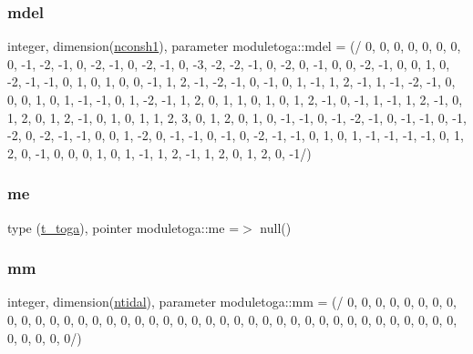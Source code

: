 \subsubsection{\texorpdfstring{mdel}{mdel}}
{\footnotesize\ttfamily integer, dimension(\mbox{\hyperlink{namespacemoduletoga_a06e41646ba24c11ab2e1b513e5c1760c}{nconsh1}}), parameter moduletoga\+::mdel = (/ 0, 0, 0, 0, 0, 0, 0, 0, -\/1, -\/2, -\/1, 0, -\/2, -\/1, 0, -\/2, -\/1, 0, -\/3, -\/2, -\/2, -\/1, 0, -\/2, 0, -\/1, 0, 0, -\/2, -\/1, 0, 0, 1, 0, -\/2, -\/1, -\/1, 0, 1, 0, 1, 0, 0, -\/1, 1, 2, -\/1, -\/2, -\/1, 0, -\/1, 0, 1, -\/1, 1, 2, -\/1, 1, -\/1, -\/2, -\/1, 0, 0, 0, 1, 0, 1, -\/1, -\/1, 0, 1, -\/2, -\/1, 1, 2, 0, 1, 1, 0, 1, 0, 1, 2, -\/1, 0, -\/1, 1, -\/1, 1, 2, -\/1, 0, 1, 2, 0, 1, 2, -\/1, 0, 1, 0, 1, 1, 2, 3, 0, 1, 2, 0, 1, 0, -\/1, -\/1, 0, -\/1, -\/2, -\/1, 0, -\/1, -\/1, 0, -\/1, -\/2, 0, -\/2, -\/1, -\/1, 0, 0, 1, -\/2, 0, -\/1, -\/1, 0, -\/1, 0, -\/2, -\/1, -\/1, 0, 1, 0, 1, -\/1, -\/1, -\/1, -\/1, 0, 1, 2, 0, -\/1, 0, 0, 0, 1, 0, 1, -\/1, 1, 2, -\/1, 1, 2, 0, 1, 2, 0, -\/1/)\hspace{0.3cm}{\ttfamily [private]}}

\mbox{\label{namespacemoduletoga_ae189511573cac5c5cde7e675f45dd4c0}} 
\subsubsection{\texorpdfstring{me}{me}}
{\footnotesize\ttfamily type (\mbox{\hyperlink{structmoduletoga_1_1t__toga}{t\+\_\+toga}}), pointer moduletoga\+::me =$>$ null()\hspace{0.3cm}{\ttfamily [private]}}

\mbox{\label{namespacemoduletoga_a3bf11793a5868095fc707ec57cb7eff0}} 
\subsubsection{\texorpdfstring{mm}{mm}}
{\footnotesize\ttfamily integer, dimension(\mbox{\hyperlink{namespacemoduletoga_ae4b0b997b6803ae8647fdd97f2dda666}{ntidal}}), parameter moduletoga\+::mm = (/ 0, 0, 0, 0, 0, 0, 0, 0, 0, 0, 0, 0, 0, 0, 0, 0, 0, 0, 0, 0, 0, 0, 0, 0, 0, 0, 0, 0, 0, 0, 0, 0, 0, 0, 0, 0, 0, 0, 0, 0, 0, 0, 0, 0, 0/)\hspace{0.3cm}{\ttfamily [private]}}

